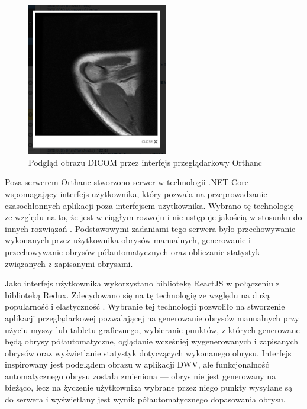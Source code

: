 \documentclass[a4paper,11pt,twoside,openright]{report}
\theoremstyle{definition}
\begin{document}
\begin{figure}[b!]
	\center
	\includegraphics[width=0.55\textwidth]{Orthanc-preview}
	\caption{Podgląd obrazu DICOM przez interfejs przeglądarkowy Orthanc}
    	\label{fig:Orthanc-preview}
\end{figure}

Poza serwerem Orthanc stworzono serwer w technologii .NET Core \cite{Dotnet} wspomagający interfejs użytkownika, który pozwala na przeprowadzanie czasochłonnych aplikacji poza interfejsem użytkownika. Wybrano tę technologię ze względu na to, że jest w ciągłym rozwoju i nie ustępuje jakością w stosunku do innych rozwiązań \cite{Dlaczego dotnet}. Podstawowymi zadaniami tego serwera było przechowywanie wykonanych przez użytkownika obrysów manualnych, generowanie i przechowywanie obrysów półautomatycznych oraz obliczanie statystyk związanych z zapisanymi obrysami.

Jako interfejs użytkownika wykorzystano bibliotekę ReactJS \cite{React} w połączeniu z biblioteką Redux. Zdecydowano się na tę technologię ze względu na dużą popularność i elastyczność \cite{Dlaczego react}. Wybranie tej technologii pozwoliło na stworzenie aplikacji przeglądarkowej pozwalającej na generowanie obrysów manualnych przy użyciu myszy lub tabletu graficznego, wybieranie punktów, z których generowane będą obrysy półautomatyczne, oglądanie wcześniej wygenerowanych i zapisanych obrysów oraz wyświetlanie statystyk dotyczących wykonanego obrysu. Interfejs inspirowany jest podglądem obrazu w aplikacji DWV, ale funkcjonalność automatycznego obrysu została zmieniona --- obrys nie jest generowany na bieżąco, lecz na życzenie użytkownika wybrane przez niego punkty wysyłane są do serwera i wyświetlany jest wynik półautomatycznego dopasowania obrysu.
\end{document}
